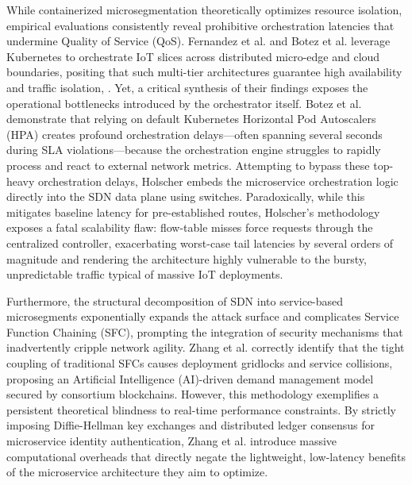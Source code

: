 \documentclass[conference]{IEEEtran}
\begin{document}
While containerized microsegmentation theoretically optimizes resource isolation, empirical evaluations consistently reveal prohibitive orchestration latencies that undermine Quality of Service (QoS). Fernandez et al. and Botez et al. leverage Kubernetes to orchestrate IoT slices across distributed micro-edge and cloud boundaries, positing that such multi-tier architectures guarantee high availability and traffic isolation\cite{b20}, \cite{b21}. Yet, a critical synthesis of their findings exposes the operational bottlenecks introduced by the orchestrator itself. Botez et al. demonstrate that relying on default Kubernetes Horizontal Pod Autoscalers (HPA) creates profound orchestration delays---often spanning several seconds during SLA violations---because the orchestration engine struggles to rapidly process and react to external network metrics\cite{b20}. Attempting to bypass these top-heavy orchestration delays, Holscher embeds the microservice orchestration logic directly into the SDN data plane using switches\cite{b30}. Paradoxically, while this mitigates baseline latency for pre-established routes, Holscher's methodology exposes a fatal scalability flaw: flow-table misses force requests through the centralized controller, exacerbating worst-case tail latencies by several orders of magnitude and rendering the architecture highly vulnerable to the bursty, unpredictable traffic typical of massive IoT deployments\cite{b30}.

Furthermore, the structural decomposition of SDN into service-based microsegments exponentially expands the attack surface and complicates Service Function Chaining (SFC), prompting the integration of security mechanisms that inadvertently cripple network agility. Zhang et al. correctly identify that the tight coupling of traditional SFCs causes deployment gridlocks and service collisions, proposing an Artificial Intelligence (AI)-driven demand management model secured by consortium blockchains\cite{b22}. However, this methodology exemplifies a persistent theoretical blindness to real-time performance constraints. By strictly imposing Diffie-Hellman key exchanges and distributed ledger consensus for microservice identity authentication, Zhang et al. introduce massive computational overheads that directly negate the lightweight, low-latency benefits of the microservice architecture they aim to optimize\cite{b22}.
\end{document}
